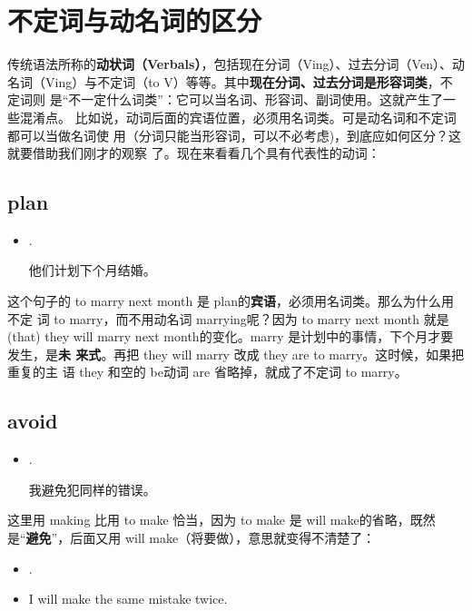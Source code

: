 \section{不定词与动名词的区分}

传统语法所称的\textbf{动状词（Verbals）}，包括现在分词（Ving）、过去分词（Ven）、动
名词（Ving）与不定词（to V）等等。其中\textbf{现在分词、过去分词是形容词类}，不定词则
是“不一定什么词类”：它可以当名词、形容词、副词使用。这就产生了一些混淆点。
比如说，动词后面的宾语位置，必须用名词类。可是动名词和不定词都可以当做名词使
用（分词只能当形容词，可以不必考虑)，到底应如何区分？这就要借助我们刚才的观察
了。现在来看看几个具有代表性的动词：

\subsection{plan}

\begin{itemize}
\item  {}  .

  他们计划下个月结婚。
\end{itemize}

这个句子的 to marry next month 是 plan的\textbf{宾语}，必须用名词类。那么为什么用不定
词 to marry，而不用动名词 marrying呢？因为 to marry next month 就是 (that)
they will marry next month的变化。marry 是计划中的事情，下个月才要发生，是\textbf{未
  来式}。再把 they will marry 改成 they are to marry。这时候，如果把重复的主
语 they 和空的 be动词 are 省略掉，就成了不定词 to marry。

\subsection{avoid}

\begin{itemize}
\item  {}  .

  我避免犯同样的错误。
\end{itemize}

这里用 making 比用 to make 恰当，因为 to make 是 will make的省略，既然
是“\textbf{避免}”，后面又用 will make（将要做），意思就变得不清楚了：

\begin{itemize}
\item  {}  .
\item  I will make the same mistake twice.
\end{itemize}

